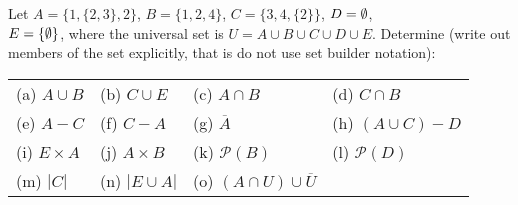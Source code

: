 \begin{questions}
\label{probA} Let 
$A = \{1, \{2, 3\}, 2\}$, 
$B = \{1, 2, 4\}$, 
$C = \{3, 4, \{2\}\}$, 
$D = \emptyset$, \\
$E = \{\emptyset\}$, 
where the universal set is $U = A \cup B \cup C \cup D \cup E$. Determine (write out members of the set explicitly, that is do not use set builder notation):

\begin{tabular}{p{1.3in}p{1.3in}p{1.3in}p{1.3in}}
 (a) $A \cup B$  & (b) $C \cup E$  & 
    (c) $A \cap B$   & (d) $C \cap B$ \\
 (e) $A - C$     & (f) $C - A$     & 
    (g) $\overline{A}$ & (h) $(A \cup C) - D$ \\
 (i) $E \times A$    & (j) $A \times B$ & 
    (k) $\mathcal{P}(B)$ & (l) $\mathcal{P}(D)$ \\
 (m) $|C|$  & (n) $|E \cup A|$ & 
    (o) $(A \cap U) \cup \overline{U}$
\end{tabular}



\end{questions}
